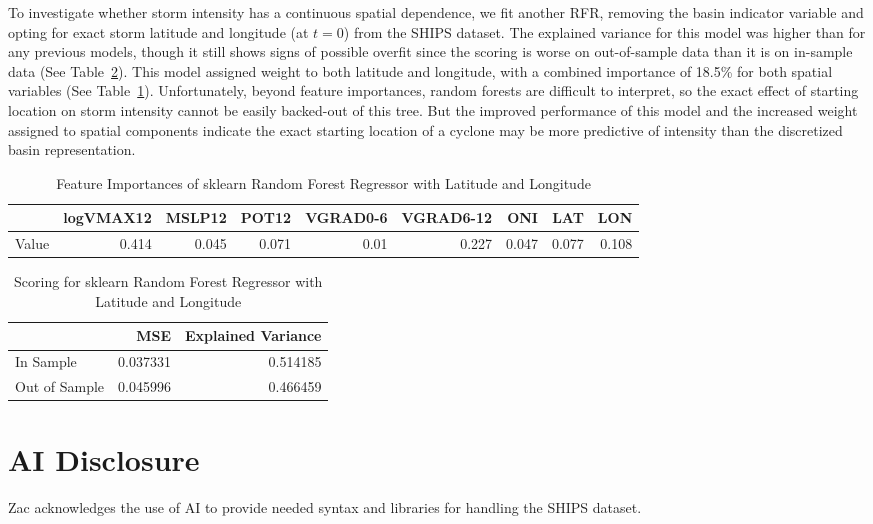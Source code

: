 \documentclass[12pt]{article}
\begin{document}
To investigate whether storm intensity has a continuous spatial dependence, we fit another RFR, removing the basin indicator variable and opting for exact storm latitude and longitude (at $t=0$) from the SHIPS dataset. The explained variance for this model was higher than for any previous models, though it still shows signs of possible overfit since the scoring is worse on out-of-sample data than it is on in-sample data (See Table~\ref{tab:latlon_rf_scoring}). This model assigned weight to both latitude and longitude, with a combined importance of 18.5\% for both spatial variables (See Table~\ref{tab:latlon_rf_importances}). Unfortunately, beyond feature importances, random forests are difficult to interpret, so the exact effect of starting location on storm intensity cannot be easily backed-out of this tree. But the improved performance of this model and the increased weight assigned to spatial components indicate the exact starting location of a cyclone may be more predictive of intensity than the discretized basin representation. 

\begin{table}[h]
\centering
\caption{Feature Importances of sklearn Random Forest Regressor with Latitude and Longitude}
\label{tab:latlon_rf_importances}
\begin{tabular}{lrrrrrrrr}
\toprule
 & logVMAX12 & MSLP12 & POT12 & VGRAD0-6 & VGRAD6-12 & ONI & LAT & LON \\
\midrule
Value & 0.414 & 0.045 & 0.071 & 0.01 & 0.227 & 0.047 & 0.077 & 0.108 \\
\bottomrule
\end{tabular}
\end{table}

\begin{table}[h]
\centering
\caption{Scoring for sklearn Random Forest Regressor with Latitude and Longitude}
\label{tab:latlon_rf_scoring}
\begin{tabular}{lrr}
\toprule
 & MSE & Explained Variance \\
\midrule
In Sample & 0.037331 & 0.514185 \\
Out of Sample & 0.045996 & 0.466459 \\
\bottomrule
\end{tabular}
\end{table}

\section{AI Disclosure}
Zac acknowledges the use of AI to provide needed syntax and libraries for handling the SHIPS dataset.



\end{document}
